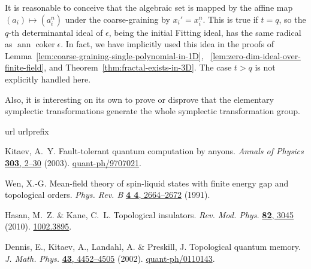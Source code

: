 \documentclass[letterpaper,12pt]{amsart}
\theoremstyle{definition} \newtheorem{defn}{Definition}
\theoremstyle{definition} \newtheorem{rem}{Remark}
\theoremstyle{definition} \newtheorem{example}{Example}
\newcommand{\coker}{\mathop{\mathrm{coker}}}
\newcommand{\ann}{\mathop{\mathrm{ann}}}
\begin{document}
It is reasonable to conceive that the algebraic set
is mapped by the affine map $(a_i) \mapsto (a_i^n)$
under the coarse-graining by $x_i' = x_i^n$.
This is true if $t=q$, so the $q$-th determinantal ideal of $\epsilon$,
being the initial Fitting ideal,
has the same radical as $\ann \coker \epsilon$.
In fact,
we have implicitly used this idea in the proofs of
Lemma~\ref{lem:coarse-graining-single-polynomial-in-1D},%
~\ref{lem:zero-dim-ideal-over-finite-field},
and Theorem~\ref{thm:fractal-exists-in-3D}.
The case $t > q$ is not explicitly handled here.

Also, it is interesting on its own to prove or disprove
that the elementary symplectic transformations 
generate the whole symplectic transformation group.


\begin{thebibliography}{10}
\expandafter\ifx\csname url\endcsname\relax
  \def\url#1{\texttt{#1}}\fi
\expandafter\ifx\csname urlprefix\endcsname\relax\def\urlprefix{URL }\fi
\providecommand{\bibinfo}[2]{#2}
\providecommand{\eprint}[2][]{\href{http://arxiv.org/abs/#2}{#2}}

\bibinfo{author}{Kitaev, A.~Y.}
\newblock \bibinfo{title}{Fault-tolerant quantum computation by anyons}.
\newblock \emph{\bibinfo{journal}{Annals of Physics}}
  \href{http://dx.doi.org/10.1016/S0003-4916(02)00018-0}{\textbf{\bibinfo{volu%
me}{303}}, \bibinfo{pages}{2--30}} (\bibinfo{year}{2003}).
\newblock \eprint{quant-ph/9707021}.

\bibinfo{author}{Wen, X.-G.}
\newblock \bibinfo{title}{Mean-field theory of spin-liquid states with finite
  energy gap and topological orders}.
\newblock \emph{\bibinfo{journal}{Phys. Rev. B}}
  \href{http://dx.doi.org/10.1103/PhysRevB.44.2664}{\textbf{\bibinfo{volume}{4%
4}}, \bibinfo{pages}{2664--2672}} (\bibinfo{year}{1991}).

\bibinfo{author}{Hasan, M.~Z.} \& \bibinfo{author}{Kane, C.~L.}
\newblock \bibinfo{title}{Topological insulators}.
\newblock \emph{\bibinfo{journal}{Rev. Mod. Phys.}}
  \href{http://dx.doi.org/10.1103/RevModPhys.82.3045}{\textbf{\bibinfo{volume}%
{82}}, \bibinfo{pages}{3045}} (\bibinfo{year}{2010}).
\newblock \eprint{1002.3895}.

\bibinfo{author}{Dennis, E.}, \bibinfo{author}{Kitaev, A.},
  \bibinfo{author}{Landahl, A.} \& \bibinfo{author}{Preskill, J.}
\newblock \bibinfo{title}{Topological quantum memory}.
\newblock \emph{\bibinfo{journal}{J. Math. Phys.}}
  \href{http://dx.doi.org/10.1063/1.1499754}{\textbf{\bibinfo{volume}{43}},
  \bibinfo{pages}{4452--4505}} (\bibinfo{year}{2002}).
\newblock \eprint{quant-ph/0110143}.


\end{thebibliography}
\end{document}
